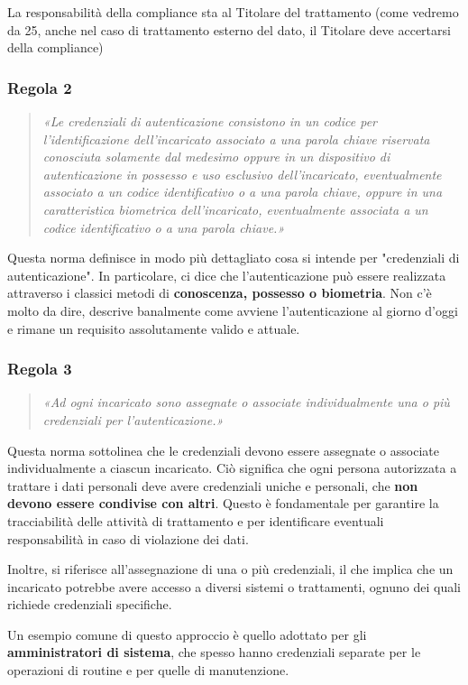 La responsabilità della compliance sta al Titolare del trattamento (come vedremo da 25, anche nel caso di trattamento esterno del dato, il Titolare deve accertarsi della compliance)
\subsubsection*{Regola 2}
\begin{quote}
    \textit{«Le credenziali di autenticazione consistono in un codice per l'identificazione dell'incaricato associato a una parola chiave riservata conosciuta solamente dal medesimo oppure in un dispositivo di autenticazione in possesso e uso esclusivo dell'incaricato, eventualmente associato a un codice identificativo o a una parola chiave, oppure in una caratteristica biometrica dell'incaricato, eventualmente associata a un codice identificativo o a una parola chiave.»}
\end{quote}
Questa norma definisce in modo più dettagliato cosa si intende per "credenziali di autenticazione". In particolare, ci dice che l'autenticazione può essere realizzata attraverso i classici metodi di \textbf{conoscenza, possesso o biometria}. Non c'è molto da dire, descrive banalmente come avviene l'autenticazione al giorno d'oggi e rimane un requisito assolutamente valido e attuale. 

\subsubsection*{Regola 3}
\begin{quote}
    \textit{«Ad ogni incaricato sono assegnate o associate individualmente una o più credenziali per l'autenticazione.»}
\end{quote}
Questa norma sottolinea che le credenziali devono essere assegnate o associate individualmente a ciascun incaricato. Ciò significa che ogni persona autorizzata a trattare i dati personali deve avere credenziali uniche e personali, che \textbf{non devono essere condivise con altri}. 
Questo è fondamentale per garantire la tracciabilità delle attività di trattamento e per identificare eventuali responsabilità in caso di violazione dei dati.

Inoltre, si riferisce all'assegnazione di una o più credenziali, il che implica che un incaricato potrebbe avere accesso a diversi sistemi o trattamenti, ognuno dei quali richiede credenziali specifiche.

Un esempio comune di questo approccio è quello adottato per gli \textbf{amministratori di sistema}, che spesso hanno credenziali separate per le operazioni di routine e per quelle di manutenzione.
